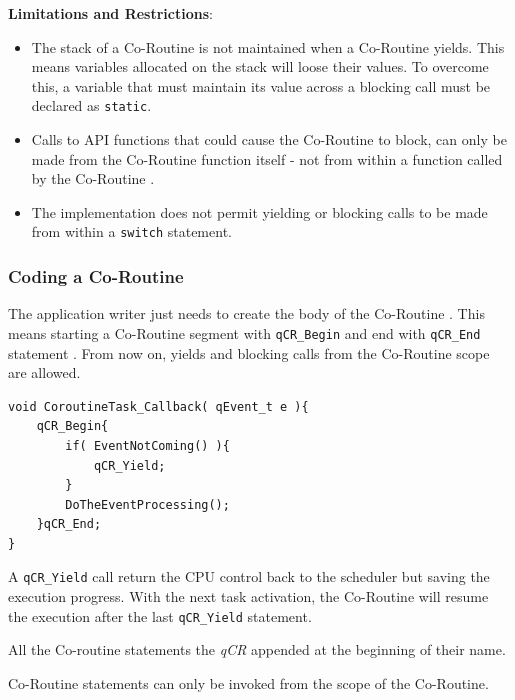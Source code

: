 \documentclass{article}
\begin{document}
\textbf{Limitations and Restrictions}:

\begin{itemize}
    \item The stack of a Co-Routine  is not maintained when a Co-Routine  yields. This means variables allocated on the stack will loose their values. To overcome this, a variable that must maintain its value across a blocking call must be declared as \lstinline{static}.
    \item Calls to API functions that could cause the Co-Routine to block, can only be made from the Co-Routine  function itself - not from within a function called by the Co-Routine .
    \item The implementation does not permit yielding or blocking calls to be made from within a \lstinline{switch} statement.
\end{itemize}

\subsubsection{Coding a Co-Routine}
The application writer just needs to create the body of the Co-Routine . This means starting a Co-Routine segment with \lstinline{qCR_Begin}  and end with \lstinline{qCR_End} statement . From now on, yields and blocking calls from the Co-Routine scope are allowed. \\

\begin{lstlisting}[style=CStyle]
void CoroutineTask_Callback( qEvent_t e ){
    qCR_Begin{        
        if( EventNotComing() ){
            qCR_Yield;
        }
        DoTheEventProcessing();
    }qCR_End;
}
\end{lstlisting}   

A \lstinline{qCR_Yield}  call return the CPU control back to the scheduler but saving the execution progress. With the next task activation, the Co-Routine will resume the execution after the last \lstinline{qCR_Yield} statement. \\

\begin{tcolorbox}
\HandRight All the Co-routine statements the \textit{qCR} appended at the beginning of their name.
\end{tcolorbox}

\begin{tcolorbox}
\HandRight Co-Routine statements can only be invoked from the scope of the Co-Routine.
\end{tcolorbox}
\end{document}
